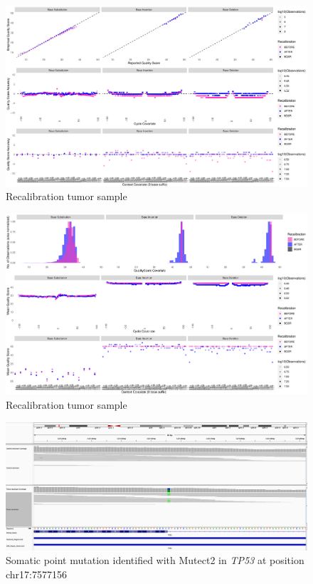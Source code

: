 \documentclass[11pt]{article}
\begin{document}
\begin{figure}[h]
   \centering
   \includegraphics[width=\textwidth]{images/recal_tumor_1_setup1.png}
   \caption{\footnotesize{Recalibration tumor sample}}
   \label{recal_tumor_1}
\end{figure}

\begin{figure}[h]
   \centering
   \includegraphics[width=\textwidth]{images/recal_tumor_2_setup1.png}
   \caption{\footnotesize{Recalibration tumor sample}}
   \label{recal_tumor_2}
\end{figure}

\begin{figure}[h]
   \centering
   \includegraphics[width=\textwidth]{images/somatic_p53_pm.png}
   \caption{\footnotesize{Somatic point mutation identified with Mutect2 in \emph{TP53} at position chr17:7577156}}
   \label{pm_p53}
\end{figure}
\end{document}
